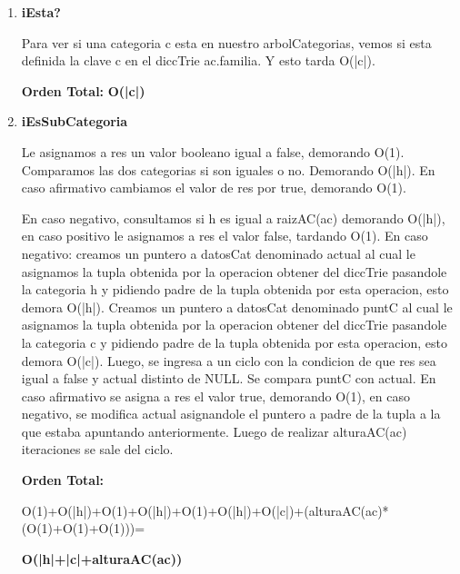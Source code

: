 \begin{enumerate}
\item\textbf{iEsta?}
\par Para ver si una categoria c esta en nuestro arbolCategorias, vemos si esta definida la clave c en el diccTrie ac.familia. Y esto tarda O(|c|).
\par \textbf{Orden Total:} \textbf{O(|c|)}

\item\textbf{iEsSubCategoria}
\par Le asignamos a res un valor booleano igual a false, demorando O(1). Comparamos las dos categorias si son iguales o no. Demorando O(|h|). En caso afirmativo cambiamos el valor de res por true, demorando O(1).
\par En caso negativo, consultamos si h es igual a raizAC(ac) demorando O(|h|), en caso positivo le asignamos a res el valor false, tardando O(1). En caso negativo: creamos un puntero a datosCat denominado actual al cual le asignamos la tupla obtenida por la operacion obtener del diccTrie pasandole la categoria h y pidiendo padre de la tupla obtenida por esta operacion, esto demora O(|h|). Creamos un puntero a datosCat denominado puntC al cual le asignamos la tupla obtenida por la operacion obtener del diccTrie pasandole la categoria c y pidiendo padre de la tupla obtenida por esta operacion, esto demora O(|c|). Luego, se ingresa a un ciclo con la condicion de que res sea igual a false y actual distinto de NULL. Se compara puntC con actual. En caso afirmativo se asigna a res el valor true, demorando O(1), en caso negativo, se modifica actual asignandole el puntero a padre de la tupla a la que estaba apuntando anteriormente. Luego de realizar alturaAC(ac) iteraciones se sale del ciclo.
\par \textbf{Orden Total:}
\par O(1)+O(|h|)+O(1)+O(|h|)+O(1)+O(|h|)+O(|c|)+(alturaAC(ac)*(O(1)+O(1)+O(1)))=
\par \textbf{O(|h|+|c|+alturaAC(ac))}

\end{enumerate}
